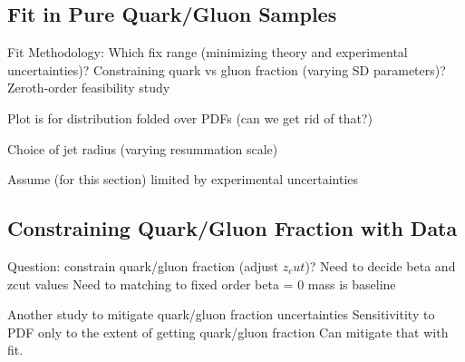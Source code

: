 \subsection{Fit in Pure Quark/Gluon Samples}

Fit Methodology:
	Which fix range (minimizing theory and experimental uncertainties)?
	Constraining quark vs gluon fraction (varying SD parameters)?
	Zeroth-order feasibility study
	
	Plot is for distribution folded over PDFs (can we get rid of that?)

	Choice of jet radius (varying resummation scale)

Assume (for this section) limited by experimental uncertainties



\subsection{Constraining Quark/Gluon Fraction with Data}

	Question:  constrain quark/gluon fraction (adjust $z_cut$)?
	Need to decide beta and zcut values
	Need to matching to fixed order
	beta = 0 mass is baseline
	
	
	Another study to mitigate quark/gluon fraction uncertainties
	Sensitivitity to PDF only to the extent of getting quark/gluon fraction
	Can mitigate that with fit.


